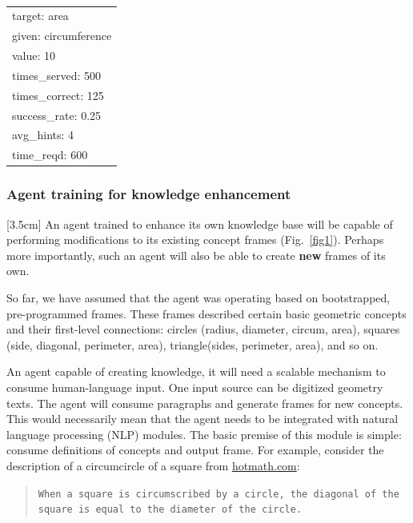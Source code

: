 \documentclass[10pt,letterpaper]{article}
\begin{document}
\begin{center}
    {\tt
        \begin{tabular}{ |l|  }
          \hline
          target: area \\
          given: circumference\\
          value: 10\\
          times\_served: 500\\
          times\_correct: 125\\
          success\_rate: 0.25\\
          avg\_hints: 4\\                    
          time\_reqd: 600\\
          \hline  
        \end{tabular}
    }
\end{center}

\subsubsection{Agent training for knowledge enhancement}
\reversemarginpar
\marginnote{\textcolor{magenta}{\scriptsize Warning:\\ This section may make your head explode due to the amount of speculation.}}[3.5cm]
An agent trained to enhance its own knowledge base will be capable of performing modifications to its existing concept frames (Fig.~\ref{fig1}). Perhaps more importantly, such an agent will also be able to create {\bf new} frames of its own. 

So far, we have assumed that the agent was operating based on bootstrapped, pre-programmed frames. These frames described certain basic geometric concepts and their first-level connections: circles (radius, diameter, circum, area), squares (side, diagonal, perimeter, area), triangle(sides, perimeter, area), and so on. 

An agent capable of creating knowledge, it will need a scalable mechanism to consume human-language input. One input source can be digitized geometry texts. The agent will consume paragraphs and generate frames for new concepts. This would necessarily mean that the agent needs to be integrated with natural language processing (NLP) modules. The basic premise of this module is simple: consume definitions of concepts and output frame. For example, consider the description of a circumcircle of a square from \href{http://hotmath.com/hotmath_help/topics/squares-circumscribed-by-circles.html}{hotmath.com}: 
\begin{quote}
\texttt{When a square is circumscribed by a circle, the diagonal of the square is equal to the diameter of the circle.}
\end{quote}
\end{document}
